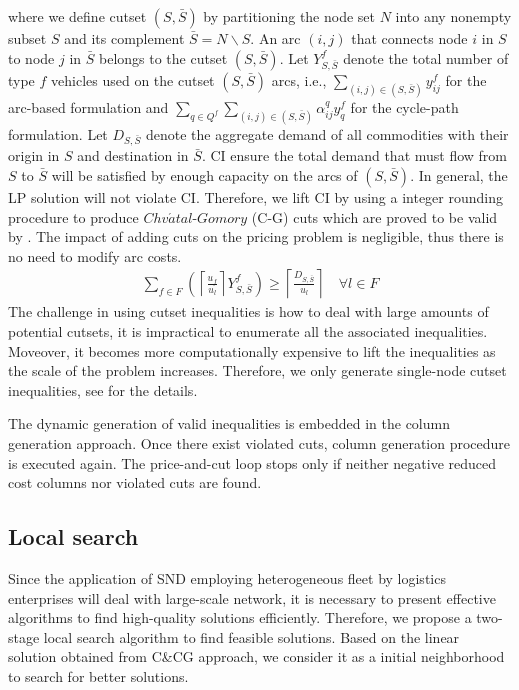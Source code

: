 \documentclass[11pt,nonblindrev,fleqn]{article}
\begin{document}
where we define cutset $(S,\bar{S})$ by partitioning the node set $N$ into any nonempty subset $S$ and its complement $\bar{S}=N\backslash S$. An arc $(i,j)$ that connects node $i$ in $S$ to node $j$ in $\bar{S}$  belongs to the cutset $(S,\bar{S})$. Let $Y_{S,\bar{S}}^f$ denote the total number of type $f$ vehicles used on the cutset $(S,\bar{S})$ arcs, i.e., $\sum_{(i,j)\in (S,\bar{S})} y_{ij}^f$ for the arc-based formulation and $\sum_{q\in Q^f}\sum_{(i,j)\in (S,\bar{S})} \alpha_{ij}^q y_q^f $ for the cycle-path formulation. Let $D_{S,\bar{S}}$ denote the aggregate demand of all commodities with their origin in $S$ and destination in $\bar{S}$. CI ensure the total demand that must flow from $S$ to $\bar{S}$ will be satisfied by enough capacity on the arcs of $(S,\bar{S})$. In general, the LP solution will not violate CI. Therefore, we lift CI by using a integer rounding procedure to produce $Chv\acute{a}tal$-$Gomory$ (C-G) cuts which are proved to be valid by \cite{Kim1999Multimodal}. The impact of adding cuts on the pricing problem is negligible, thus there is no need to modify arc costs.
\begin{align}
  \sum_{f\in F} \left( \left \lceil \frac{u_f}{u_l} \right \rceil Y_{S,\bar{S}}^f  \right)  \geq \left\lceil \frac{D_{S,\bar{S}}}{u_l} \right\rceil  \quad   \forall l\in F
\end{align}
The challenge in using cutset inequalities is how to deal with large amounts of potential cutsets, it is impractical to enumerate all the associated inequalities. Moveover, it becomes more computationally expensive to lift the inequalities as the scale of the problem increases. Therefore, we only generate single-node cutset inequalities, see \cite{Chouman2016Commodity} for the details.

The dynamic generation of valid inequalities is embedded in the column generation approach. Once there exist violated cuts, column generation procedure is executed again. The price-and-cut loop stops only if neither negative reduced cost columns nor violated cuts are found.

\subsection{Local search}\label{localSearch}
Since the application of SND employing heterogeneous fleet by logistics enterprises will deal with large-scale network, it is necessary to present effective algorithms to find high-quality solutions efficiently. Therefore, we propose a two-stage local search algorithm to find feasible solutions. Based on the linear solution obtained from C\&CG approach, we consider it as a initial neighborhood to search for better solutions.
\end{document}
